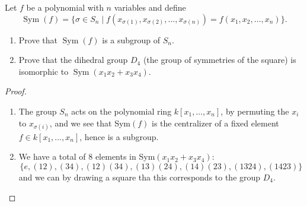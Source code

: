 \begin{prob}[S2019-Q4]
    Let \( f \) be a polynomial with \( n \) variables and define
\[
\operatorname{Sym}(f) = \{ \sigma \in S_n \mid f(x_{\sigma(1)}, x_{\sigma(2)}, \ldots, x_{\sigma(n)}) = f(x_1, x_2, \ldots, x_n) \}.
\]

\begin{enumerate}
    \item Prove that \(\operatorname{Sym}(f)\) is a subgroup of \( S_n \).
    
    \item Prove that the dihedral group \( D_4 \) (the group of symmetries of the square) is isomorphic to \(\operatorname{Sym}(x_1 x_2 + x_3 x_4)\).
\end{enumerate}
\end{prob}
\begin{proof}
    \begin{enumerate}
        \item The group $S_n$ acts on the polynomial ring $k[x_1,\dots,x_n]$, by permuting the $x_i$ to $x_{\sigma(i)}$, and we see that Sym$(f)$ is the centralizer of a fixed element $f\in k[x_1,\dots,x_n]$, hence is a subgroup.
        \item We have a total of $8$ elements in Sym$(x_1x_2+x_3x_4)$: 
        \begin{equation*}
            \{e, (12), (34), (12)(34), (13)(24), (14)(23), (1324), (1423)\}
        \end{equation*}
        and we can by drawing a square tha this corresponds to the group $D_4$.
    \end{enumerate}
\end{proof}

